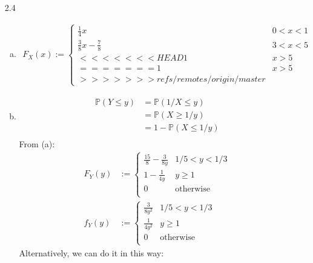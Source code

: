 \documentclass[a4paper,10pt]{article}
\theoremstyle{definition}
\begin{document}
\begin{enumerate}
\begin{enumerate}
\end{enumerate}
\item[2.4] 
\begin{enumerate}[(a)]
\item 
\begin{align*}
F_X(x):= \begin{cases}
\frac{1}{4}x & 0 < x < 1\\
\frac{3}{8}x-\frac{7}{8} & 3 < x < 5\\
<<<<<<< HEAD
1 & x > 5\\
=======
1 & x>5\\
>>>>>>> refs/remotes/origin/master
\end{cases}
\end{align*}
\item
\begin{align*}
\mathbb{P}(Y \leq y) &= \mathbb{P}(1/X\leq y)\\
&=\mathbb{P}(X\geq 1/y)\\
&=1 - \mathbb{P}(X\leq 1/y)\\
\end{align*}
From (a):
\begin{align*}
F_Y(y)&:= \begin{cases}
\frac{15}{8}-\frac{3}{8y} & 1/5 < y < 1/3\\
1 - \frac{1}{4y} & y \geq 1\\
0 & \text{otherwise}\\
\end{cases}\\
f_Y(y)&:= \begin{cases}
\frac{3}{8y^2} & 1/5 < y < 1/3\\
\frac{1}{4y^2} & y \geq 1\\
0 & \text{otherwise}\\
\end{cases}
\end{align*}
Alternatively, we can do it in this way:


\end{enumerate}
\end{enumerate}
\end{document}
